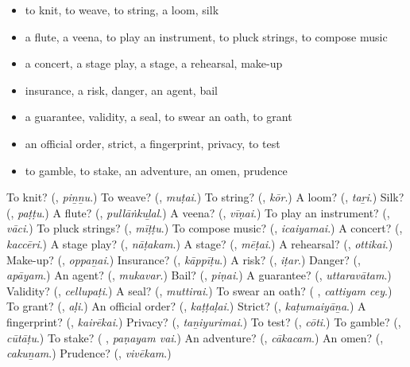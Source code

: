 \begin{itemize}
\raggedright
  \item to knit, to weave, to string, a loom, silk
  \item a flute, a veena, to play an instrument, to pluck strings, to compose music
  \item a concert, a stage play, a stage, a rehearsal, make-up
  \item insurance, a risk, danger, an agent, bail
  \item a guarantee, validity, a seal, to swear an oath, to grant
  \item an official order, strict, a fingerprint, privacy, to test
  \item to gamble, to stake, an adventure, an omen, prudence
\end{itemize}

\begin{tcolorbox}[breakable,colback=teal!4,colframe=teal!35!black,title={Before you move on}]
To knit? (\textbf{}, \emph{piṉṉu}.) To weave? (\textbf{}, \emph{muṭai}.) To string? (\textbf{}, \emph{kōr}.) A loom? (\textbf{}, \emph{taṟi}.) Silk? (\textbf{}, \emph{paṭṭu}.) A flute? (\textbf{}, \emph{pullāṅkuḻal}.) A veena? (\textbf{}, \emph{vīṇai}.) To play an instrument? (\textbf{}, \emph{vāci}.) To pluck strings? (\textbf{}, \emph{mīṭṭu}.) To compose music? (\textbf{}, \emph{icaiyamai}.) A concert? (\textbf{}, \emph{kaccēri}.) A stage play? (\textbf{}, \emph{nāṭakam}.) A stage? (\textbf{}, \emph{mēṭai}.) A rehearsal? (\textbf{}, \emph{ottikai}.) Make-up? (\textbf{}, \emph{oppaṉai}.) Insurance? (\textbf{}, \emph{kāppīṭu}.) A risk? (\textbf{}, \emph{iṭar}.) Danger? (\textbf{}, \emph{apāyam}.) An agent? (\textbf{}, \emph{mukavar}.) Bail? (\textbf{}, \emph{piṇai}.) A guarantee? (\textbf{}, \emph{uttaravātam}.) Validity? (\textbf{}, \emph{cellupaṭi}.) A seal? (\textbf{}, \emph{muttirai}.) To swear an oath? (\textbf{ }, \emph{cattiyam cey}.) To grant? (\textbf{}, \emph{aḷi}.) An official order? (\textbf{}, \emph{kaṭṭaḷai}.) Strict? (\textbf{}, \emph{kaṭumaiyāṉa}.) A fingerprint? (\textbf{}, \emph{kairēkai}.) Privacy? (\textbf{}, \emph{taṉiyurimai}.) To test? (\textbf{}, \emph{cōti}.) To gamble? (\textbf{}, \emph{cūtāṭu}.) To stake? (\textbf{ }, \emph{paṇayam vai}.) An adventure? (\textbf{}, \emph{cākacam}.) An omen? (\textbf{}, \emph{cakuṉam}.) Prudence? (\textbf{}, \emph{vivēkam}.)
\end{tcolorbox}
